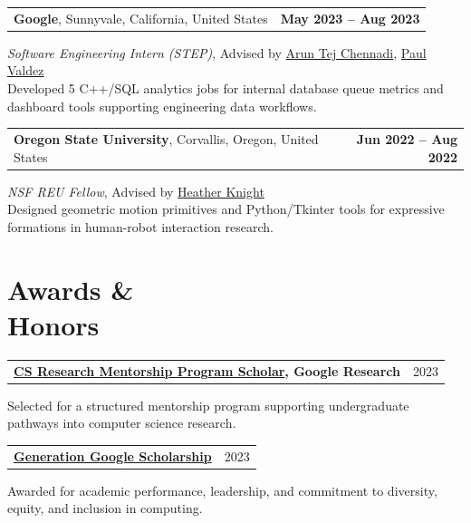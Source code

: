 \documentclass[margin,line]{res}
\begin{document}
\begin{resume}
\begin{tabularx}{\textwidth}{@{}X r@{}}
\textbf{Google}, Sunnyvale, California, United States & \textbf{May 2023 -- Aug 2023} \\
\end{tabularx}
\emph{Software Engineering Intern (STEP)}, Advised by \href{https://www.linkedin.com/in/aruntejch/}{\textcolor{cvblue}{Arun Tej Chennadi}}, \href{https://www.linkedin.com/in/paul-valdez/}{\textcolor{cvblue}{Paul Valdez}} \\
Developed 5 C++/SQL analytics jobs for internal database queue metrics and dashboard tools supporting engineering data workflows.

\begin{tabularx}{\textwidth}{@{}X r@{}}
\textbf{Oregon State University}, Corvallis, Oregon, United States & \textbf{Jun 2022 -- Aug 2022} \\
\end{tabularx}
\emph{NSF REU Fellow}, Advised by \href{https://www.charismarobotics.com/}{\textcolor{cvblue}{Heather Knight}} \\
Designed geometric motion primitives and Python/Tkinter tools for expressive formations in human-robot interaction research.


\section{\sc Awards \&\\ Honors} 
\begin{tabularx}{\textwidth}{@{}X r@{}}
\textbf{\href{https://research.google/programs-and-events/csrmp/}{\textcolor{cvblue}{CS Research Mentorship Program Scholar}}, Google Research} & {2023} \\
\end{tabularx}
Selected for a structured mentorship program supporting undergraduate pathways into computer science research.

\begin{tabularx}{\textwidth}{@{}X r@{}}
\textbf{\href{https://buildyourfuture.withgoogle.com/scholarships/generation-google-scholarship}{\textcolor{cvblue}{Generation Google Scholarship}}} & {2023} \\
\end{tabularx}
Awarded for academic performance, leadership, and commitment to diversity, equity, and inclusion in computing.


\end{resume}
\end{document}
